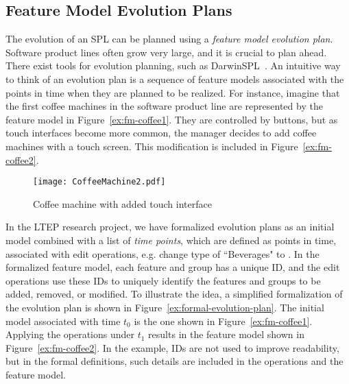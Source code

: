 \subsection{Feature Model Evolution Plans}
\label{sub:feature-model-evolution-plans}
The evolution of an SPL can be planned using a \emph{feature model evolution plan}. Software product lines often grow very large, and it is crucial to plan ahead. 
There exist tools for evolution planning, such as DarwinSPL~\cite{art:darwinspl-an-integrated-tool-suite-for-modeling-evolving-context-aware-software-product-lines}. An intuitive way to think of an evolution plan is a sequence of feature models associated with the points in time when they are planned to be realized. For instance, imagine that the first coffee machines in the software product line are represented by the feature model in Figure~\vref{ex:fm-coffee1}. They are controlled by buttons, but as touch interfaces become more common, the manager decides to add coffee machines with a touch screen. This modification is included in Figure~\vref{ex:fm-coffee2}.


\begin{figure}
   \begin{center}
      \texttt{[image: CoffeeMachine2.pdf]}
   \end{center}
   \caption[Coffee machine with added touch interface]{Coffee machine with added touch interface \footnotemark}
   \label{ex:fm-coffee2}
\end{figure}


In the LTEP research project, we have formalized evolution plans as an initial model combined with a list of \emph{time points}, which are defined as points in time, associated with edit operations, e.g. change type of ``Beverages" to \optional{}. In the formalized feature model, each feature and group has a unique ID, and the edit operations use these IDs to uniquely identify the features and groups to be added, removed, or modified. To illustrate the idea, a simplified formalization of the evolution plan is shown in Figure~\vref{ex:formal-evolution-plan}. The initial model associated with time $t_0$ is the one shown in Figure~\vref{ex:fm-coffee1}. Applying the operations under $t_1$ results in the feature model shown in Figure~\vref{ex:fm-coffee2}. In the example, IDs are not used to improve readability, but in the formal definitions, such details are included in the operations and the feature model. 

